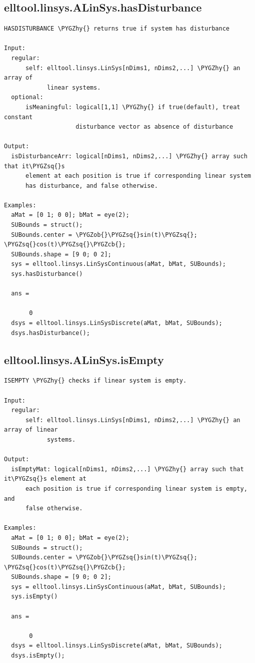 \documentclass[letterpaper,10pt,english]{sphinxmanual}
\def\PYGZob{\char`\{}
\def\PYGZcb{\char`\}}
\def\PYGZhy{\char`\-}
\def\PYGZsq{\char`\'}
\begin{document}
\subsection{elltool.linsys.ALinSys.hasDisturbance}
\label{chap_functions:elltool-linsys-alinsys-hasdisturbance}
\begin{Verbatim}[commandchars=\\\{\}]
HASDISTURBANCE \PYGZhy{} returns true if system has disturbance

Input:
  regular:
      self: elltool.linsys.LinSys[nDims1, nDims2,...] \PYGZhy{} an array of
            linear systems.
  optional:
      isMeaningful: logical[1,1] \PYGZhy{} if true(default), treat constant
                    disturbance vector as absence of disturbance

Output:
  isDisturbanceArr: logical[nDims1, nDims2,...] \PYGZhy{} array such that it\PYGZsq{}s
      element at each position is true if corresponding linear system
      has disturbance, and false otherwise.

Examples:
  aMat = [0 1; 0 0]; bMat = eye(2);
  SUBounds = struct();
  SUBounds.center = \PYGZob{}\PYGZsq{}sin(t)\PYGZsq{}; \PYGZsq{}cos(t)\PYGZsq{}\PYGZcb{};
  SUBounds.shape = [9 0; 0 2];
  sys = elltool.linsys.LinSysContinuous(aMat, bMat, SUBounds);
  sys.hasDisturbance()

  ans =

       0
  dsys = elltool.linsys.LinSysDiscrete(aMat, bMat, SUBounds);
  dsys.hasDisturbance();
\end{Verbatim}


\subsection{elltool.linsys.ALinSys.isEmpty}
\label{chap_functions:elltool-linsys-alinsys-isempty}
\begin{Verbatim}[commandchars=\\\{\}]
ISEMPTY \PYGZhy{} checks if linear system is empty.

Input:
  regular:
      self: elltool.linsys.LinSys[nDims1, nDims2,...] \PYGZhy{} an array of linear
            systems.

Output:
  isEmptyMat: logical[nDims1, nDims2,...] \PYGZhy{} array such that it\PYGZsq{}s element at
      each position is true if corresponding linear system is empty, and
      false otherwise.

Examples:
  aMat = [0 1; 0 0]; bMat = eye(2);
  SUBounds = struct();
  SUBounds.center = \PYGZob{}\PYGZsq{}sin(t)\PYGZsq{}; \PYGZsq{}cos(t)\PYGZsq{}\PYGZcb{};
  SUBounds.shape = [9 0; 0 2];
  sys = elltool.linsys.LinSysContinuous(aMat, bMat, SUBounds);
  sys.isEmpty()

  ans =

       0
  dsys = elltool.linsys.LinSysDiscrete(aMat, bMat, SUBounds);
  dsys.isEmpty();
\end{Verbatim}
\end{document}
